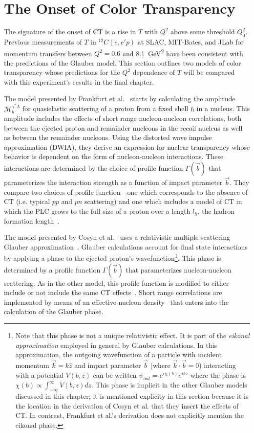 \section{The Onset of Color Transparency}
The signature of the onset of CT is a rise in $T$ with $Q^2$ above some
threshold $Q^2_0$.
Previous measurements of $T$ in ${}^{12}C(e,e'p)$ at SLAC, MIT-Bates, and JLab
for momentum transfers between $Q^2=0.6$ and
\SI{8.1}{\giga\electronvolt\squared} have been consistent with the predictions
of the Glauber model.
This section outlines two models of color transparency whose predictions for
the $Q^2$ dependence of $T$ will be compared with this experiment's results in
the final chapter.


The model presented by Frankfurt et al.~\cite{Frankfurt_1995_PRC} starts by
calculating the amplitude $\mathcal{M}_{h}^{\gamma^*A}$ for quasielastic
scattering of a proton from a fixed shell $h$ in a nucleus.
This amplitude includes the effects of short range nucleon-nucleon
correlations, both between the ejected proton and remainder nucleons in the
recoil nucleus as well as between the remainder nucleons.
Using the distorted wave impulse approximation (DWIA), they derive an
expression for nuclear transparency whose behavior is dependent on the form of
nucleon-nucleon interactions.
These interactions are determined by the choice of profile function
$\Gamma(\vec{b})$ that parameterizes the interaction strength as a function of
impact parameter $\vec{b}$.
They compare two choices of profile function---one which corresponds to the
absence of CT (i.e. typical $pp$ and $pn$ scattering) and one which includes a
model of CT in which the PLC grows to the full size of a proton over a length
$l_h$, the hadron formation length~\cite{Farrar_1988}.


The model presented by Cosyn et al.~\cite{Cosyn_2008,Cosyn_2006} uses a
relativistic multiple scattering Glauber approximation~\cite{Ryckebusch_2003}.
Glauber calculations account for final state interactions by applying a phase
to the ejected proton's
wavefunction\footnote{Note that this phase is not a unique relativistic effect.
It is part of the \textit{eikonal approximation} employed in general by
Glauber calculations.
In this approximation, the outgoing wavefunction of a particle with
incident momentum $\vec{k}=k\hat{z}$ and impact parameter $\vec{b}$ (where
$\vec{k}\cdot\vec{b}=0$) interacting with a potential $V(b,z)$
can be written $\psi_{out} = e^{i\chi(b)}e^{ikz}$ where the phase is
$\chi(b) \propto \int_{-\infty}^{\infty} V(b,z) dz$.
This phase is implicit in the other Glauber models discussed in this
chapter; it is mentioned explicity in this section because it is the location
in the derivation of Cosyn et al. that they insert the effects of CT.
In contrast, Frankfurt et al.'s derivation does not explicitly mention the
eikonal phase.
}.
This phase is determined by a profile function $\Gamma(\vec{b})$ that
parameterizes nucleon-nucleon scattering.
As in the other model, this profile function is modified to either include
or not include the same CT effects~\cite{Farrar_1988}.
Short range correlations are implemented by means of an effective nucleon
density~\cite{Frankel_1994} that enters into the calculation of the Glauber
phase.



